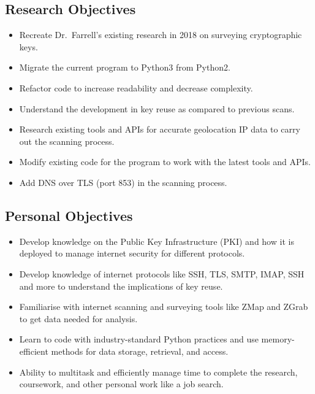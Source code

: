 \subsection{Research Objectives}
\begin{itemize}
    \item Recreate Dr.~Farrell's existing research in 2018 on surveying cryptographic keys.
    \item Migrate the current program to Python3 from Python2.
    \item Refactor code to increase readability and decrease complexity.
    \item Understand the development in key reuse as compared to previous scans.
    \item Research existing tools and APIs for accurate geolocation IP data to carry out the scanning process.
    \item Modify existing code for the program to work with the latest tools and APIs.
    \item Add DNS over TLS (port 853) in the scanning process.
\end{itemize}

\subsection{Personal Objectives}
\begin{itemize}
    \item Develop knowledge on the Public Key Infrastructure (PKI) and how it is deployed to manage internet security for different protocols.
    \item Develop knowledge of internet protocols like SSH, TLS, SMTP, IMAP, SSH and more to understand the implications of key reuse.
    \item Familiarise with internet scanning and surveying tools like ZMap and ZGrab to get data needed for analysis.
    \item Learn to code with industry-standard Python practices and use memory-efficient methods for data storage, retrieval, and access.
    \item Ability to multitask and efficiently manage time to complete the research, coursework, and other personal work like a job search. 
\end{itemize}
\pagebreak

